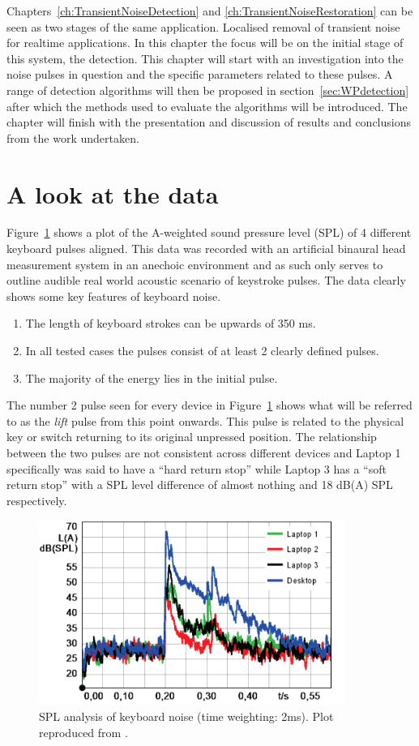 Chapters~\ref{ch:TransientNoiseDetection} and \ref{ch:TransientNoiseRestoration} can be seen as two stages of the same application. Localised removal of transient noise for realtime applications. In this chapter the focus will be on the initial stage of this system, the detection. This chapter will start with an investigation into the noise pulses in question and the specific parameters related to these pulses. A range of detection algorithms will then be proposed in section~\ref{sec:WPdetection} after which the methods used to evaluate the algorithms will be introduced. The chapter will finish with the presentation and discussion of results and conclusions from the work undertaken.

\section{A look at the data}\label{sec:WPdata}
Figure~\ref{fig:TypingSPLKeyboards} shows a plot of the A-weighted sound pressure level (SPL) of 4 different keyboard pulses aligned\cite{Hauswirth2013}. This data was recorded with an artificial binaural head measurement system in an anechoic environment and as such only serves to outline audible real world acoustic scenario of keystroke pulses. The data clearly shows some key features of keyboard noise.
\begin{enumerate}
\item The length of keyboard strokes can be upwards of 350 ms.
\item In all tested cases the pulses consist of at least 2 clearly defined pulses.
\item The majority of the energy lies in the initial pulse.
\end{enumerate}

The number 2 pulse seen for every device in Figure~\ref{fig:TypingSPLKeyboards} shows what will be referred to as the \emph{lift} pulse from this point onwards. This pulse is related to the physical key or switch returning to its original unpressed position. The relationship between the two pulses are not consistent across different devices and Laptop 1 specifically was said to have a ``hard return stop'' while Laptop 3 has a ``soft return stop'' with a SPL level difference of almost nothing and 18 dB(A) SPL respectively.

\begin{figure}[!] %
\centering
\includegraphics[width=100mm]{TypingSPLKeyboards.png}
\caption{SPL analysis of keyboard noise (time weighting: 2ms). Plot reproduced from \cite{Hauswirth2013}.}\label{fig:TypingSPLKeyboards}
\end{figure}

